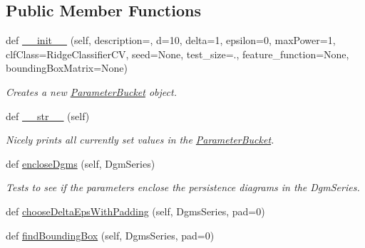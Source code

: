 \subsection*{Public Member Functions}
\begin{DoxyCompactItemize}
\item
def \hyperlink{classteaspoon_1_1_m_l_1_1tents_1_1_parameter_bucket_a560cd613a020c1081f2ac0fa8caec4c5}{\+\_\+\+\_\+init\+\_\+\+\_\+} (self, description=\textquotesingle{}\textquotesingle{}, d=10, delta=1, epsilon=0, max\+Power=1, clf\+Class=Ridge\+Classifier\+CV, seed=None, test\+\_\+size=., feature\+\_\+function=None, bounding\+Box\+Matrix=None)
\begin{DoxyCompactList}\small\item\em Creates a new \hyperlink{classteaspoon_1_1_m_l_1_1tents_1_1_parameter_bucket}{Parameter\+Bucket} object. \end{DoxyCompactList}\item
\mbox{\label{classteaspoon_1_1_m_l_1_1tents_1_1_parameter_bucket_a39e9d1148208dce4a8dec9354afb789d}}
def \hyperlink{classteaspoon_1_1_m_l_1_1tents_1_1_parameter_bucket_a39e9d1148208dce4a8dec9354afb789d}{\+\_\+\+\_\+str\+\_\+\+\_\+} (self)
\begin{DoxyCompactList}\small\item\em Nicely prints all currently set values in the \hyperlink{classteaspoon_1_1_m_l_1_1tents_1_1_parameter_bucket}{Parameter\+Bucket}. \end{DoxyCompactList}\item
def \hyperlink{classteaspoon_1_1_m_l_1_1tents_1_1_parameter_bucket_afbc1ce46c67e2a86a72d93cdcba558ea}{enclose\+Dgms} (self, Dgm\+Series)
\begin{DoxyCompactList}\small\item\em Tests to see if the parameters enclose the persistence diagrams in the Dgm\+Series. \end{DoxyCompactList}\item
def \hyperlink{classteaspoon_1_1_m_l_1_1tents_1_1_parameter_bucket_a4dd95135123384b08f2e8fccd11e7d27}{choose\+Delta\+Eps\+With\+Padding} (self, Dgms\+Series, pad=0)
\item
def \hyperlink{classteaspoon_1_1_m_l_1_1tents_1_1_parameter_bucket_a3fc98af840bf6f0f9f552e2e2f664fe8}{find\+Bounding\+Box} (self, Dgms\+Series, pad=0)
\end{DoxyCompactItemize}
